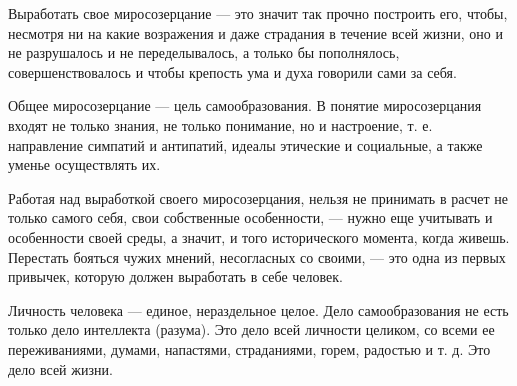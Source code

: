 Выработать свое миросозерцание --- это значит так прочно построить его, чтобы, несмотря ни на какие возражения и даже страдания в течение всей жизни, оно и не разрушалось и не переделывалось, а только бы пополнялось, совершенствовалось и чтобы крепость ума и духа говорили сами за себя.

Общее миросозерцание --- цель самообразования. В понятие миросозерцания входят не только знания, не только понимание, но и настроение, т. е. направление симпатий и антипатий, идеалы этические и социальные, а также уменье осуществлять их.

Работая над выработкой своего миросозерцания, нельзя не принимать в расчет не только самого себя, свои собственные особенности, --- нужно еще учитывать и особенности своей среды, а значит, и того исторического момента, когда живешь. Перестать бояться чужих мнений, несогласных со своими, --- это одна из первых привычек, которую должен выработать в себе человек.

Личность человека --- единое, нераздельное целое. Дело самообразования не есть только дело интеллекта (разума). Это дело всей личности целиком, со всеми ее переживаниями, думами, напастями, страданиями, горем, радостью и т. д. Это дело всей жизни.

